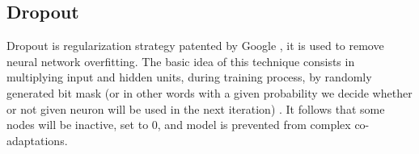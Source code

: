 \documentclass[licencjacka,en]{pracamgr}
\begin{document}
	\subsection{Dropout}
	Dropout is regularization strategy patented by Google \cite{DROPG}, it is used to remove neural network overfitting. The basic idea of this technique consists in multiplying input and hidden units, during training process, by randomly generated bit mask (or in other words with a given probability we decide whether or not given neuron will be used in the next iteration) \cite{DROPW}. It follows that some nodes will be inactive, set to 0, and model is prevented from complex co-adaptations.
	
	\dropouticm
	
	
	
\end{document}
